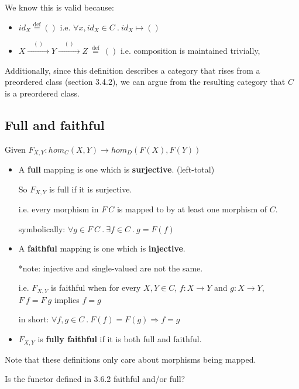 \documentclass[../main.tex]{subfiles}
\begin{document}
We know this is valid because:
\begin{itemize}
  \item $id_X \stackrel{\text{def}}{=} ()$ \qquad i.e. $\forall x,id_X \in C ~.~ id_X \mapsto ()$
  \item $X \xrightarrow{\quad () \quad} Y \xrightarrow{\quad () \quad} Z ~\stackrel{\text{def}}{=}~ ()$ \qquad i.e. composition is maintained trivially,
\end{itemize}

Additionally, since this definition describes a category that rises from a preordered class (section 3.4.2), we can argue from the resulting category that $C$ is a preordered class.

\subsection{Full and faithful}

Given $F_{X,Y} : hom_C(X,Y) \rightarrow hom_D(F(X),F(Y))$

\begin{itemize}
\item A \textbf{full} mapping is one which is \textbf{surjective}. (left-total)

So $F_{X,Y}$ is full if it is surjective.

i.e. every morphism in $F~C$ is mapped to by at least one morphism of $C$.

symbolically: $\forall g \in F~C ~.~\exists f \in C ~.~g =F(f)  $

\item A \textbf{faithful} mapping is one which is \textbf{injective}.

*note: injective and single-valued are not the same.

i.e. $F_{X,Y}$ is faithful when for every $X,Y \in C$, $f : X \rightarrow Y$ and $g : X \rightarrow Y$, $F~f = F~g$ implies $f = g$

in short: $\forall f , g \in C~.~F(f) = F(g) \Rightarrow f = g$


\item $F_{X,Y}$ is \textbf{fully faithful} if it is both full and faithful.

\end{itemize}

Note that these definitions only care about morphisms being mapped.

Is the functor defined in 3.6.2 faithful and/or full?
\end{document}
